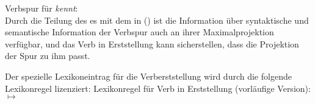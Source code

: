 \eas
\label{le-verbspur-kennt}%
Verbspur für \emph{kennt}:\\
\samepage
{}
\zs
Durch die Teilung des \localw{}es mit dem \dslw in () ist die Information
über syntaktische und semantische Information der Verbspur auch an ihrer Maximalprojektion
verfügbar, und das Verb in Erststellung kann sicherstellen, dass die Projektion der Spur zu ihm passt.

Der spezielle Lexikoneintrag für die Verberststellung wird durch die folgende
Lexikonregel lizenziert:
\eas
\label{lr-verb-movement}%
Lexikonregel für Verb in Erststellung (vorläufige Version):\\
 $\mapsto$\\
\flushright{}
\zs
\medskip

